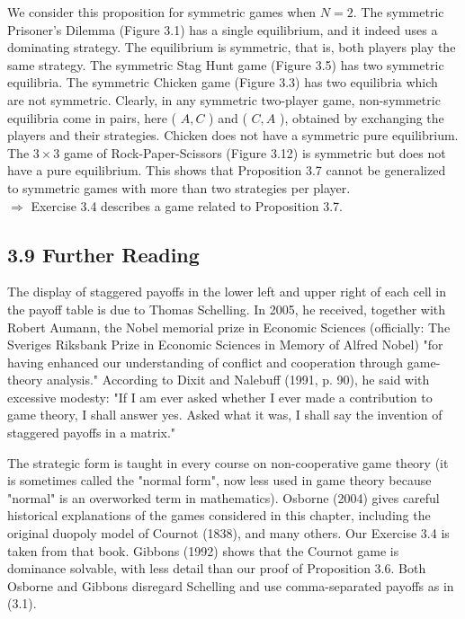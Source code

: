 \documentclass[12pt]{article}
\begin{document}
We consider this proposition for symmetric games when $N=2$. The symmetric Prisoner's Dilemma (Figure 3.1) has a single equilibrium, and it indeed uses a dominating strategy. The equilibrium is symmetric, that is, both players play the same strategy. The symmetric Stag Hunt game (Figure 3.5) has two symmetric equilibria. The symmetric Chicken game (Figure 3.3) has two equilibria which\\
are not symmetric. Clearly, in any symmetric two-player game, non-symmetric equilibria come in pairs, here ( $A, C$ ) and ( $C, A$ ), obtained by exchanging the players and their strategies. Chicken does not have a symmetric pure equilibrium. The $3 \times 3$ game of Rock-Paper-Scissors (Figure 3.12) is symmetric but does not have a pure equilibrium. This shows that Proposition 3.7 cannot be generalized to symmetric games with more than two strategies per player.\\
$\Rightarrow$ Exercise 3.4 describes a game related to Proposition 3.7.

\subsection*{3.9 Further Reading}
The display of staggered payoffs in the lower left and upper right of each cell in the payoff table is due to Thomas Schelling. In 2005, he received, together with Robert Aumann, the Nobel memorial prize in Economic Sciences (officially: The Sveriges Riksbank Prize in Economic Sciences in Memory of Alfred Nobel) "for having enhanced our understanding of conflict and cooperation through game-theory analysis." According to Dixit and Nalebuff (1991, p. 90), he said with excessive modesty: "If I am ever asked whether I ever made a contribution to game theory, I shall answer yes. Asked what it was, I shall say the invention of staggered payoffs in a matrix."

The strategic form is taught in every course on non-cooperative game theory (it is sometimes called the "normal form", now less used in game theory because "normal" is an overworked term in mathematics). Osborne (2004) gives careful historical explanations of the games considered in this chapter, including the original duopoly model of Cournot (1838), and many others. Our Exercise 3.4 is taken from that book. Gibbons (1992) shows that the Cournot game is dominance solvable, with less detail than our proof of Proposition 3.6. Both Osborne and Gibbons disregard Schelling and use comma-separated payoffs as in (3.1).
\end{document}
